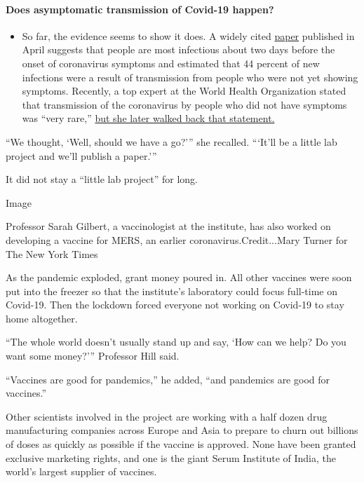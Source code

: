 \begin{itemize}
{  \paragraph{Does asymptomatic transmission of Covid-19
  happen?}\label{does-asymptomatic-transmission-of-covid-19-happen}}

  \begin{itemize}
  \tightlist
  \item
    So far, the evidence seems to show it does. A widely cited
    \href{https://www.nature.com/articles/s41591-020-0869-5}{paper}
    published in April suggests that people are most infectious about
    two days before the onset of coronavirus symptoms and estimated that
    44 percent of new infections were a result of transmission from
    people who were not yet showing symptoms. Recently, a top expert at
    the World Health Organization stated that transmission of the
    coronavirus by people who did not have symptoms was ``very rare,''
    \href{https://www.nytimes.com/2020/06/09/world/coronavirus-updates.html?action=click\&pgtype=Article\&state=default\&region=MAIN_CONTENT_3\&context=storylines_faq\#link-1f302e21}{but
    she later walked back that statement.}
  \end{itemize}
\end{itemize}

``We thought, `Well, should we have a go?''' she recalled. ```It'll be a
little lab project and we'll publish a paper.'''

It did not stay a ``little lab project'' for long.

Image

Professor Sarah Gilbert, a vaccinologist at the institute, has also
worked on developing a vaccine for MERS, an earlier
coronavirus.Credit...Mary Turner for The New York Times

As the pandemic exploded, grant money poured in. All other vaccines were
soon put into the freezer so that the institute's laboratory could focus
full-time on Covid-19. Then the lockdown forced everyone not working on
Covid-19 to stay home altogether.

``The whole world doesn't usually stand up and say, `How can we help? Do
you want some money?''' Professor Hill said.

``Vaccines are good for pandemics,'' he added, ``and pandemics are good
for vaccines.''

Other scientists involved in the project are working with a half dozen
drug manufacturing companies across Europe and Asia to prepare to churn
out billions of doses as quickly as possible if the vaccine is approved.
None have been granted exclusive marketing rights, and one is the giant
Serum Institute of India, the world's largest supplier of vaccines.

